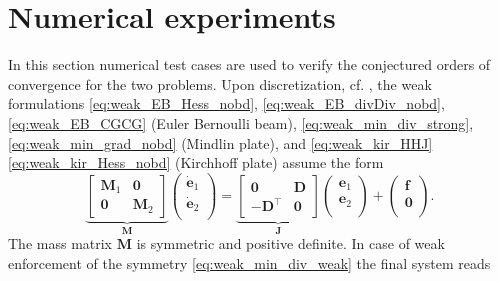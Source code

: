\section{Numerical experiments}
\label{sec:numerics_mixed}
In this section numerical test cases are used to verify the conjectured orders of convergence for the two problems. Upon discretization, cf. , the weak formulations \eqref{eq:weak_EB_Hess_nobd}, \eqref{eq:weak_EB_divDiv_nobd}, \eqref{eq:weak_EB_CGCG} (Euler Bernoulli beam), \eqref{eq:weak_min_div_strong}, \eqref{eq:weak_min_grad_nobd} (Mindlin plate), and \eqref{eq:weak_kir_HHJ} \eqref{eq:weak_kir_Hess_nobd} (Kirchhoff plate) assume the form 
\begin{equation*}
\underbrace{
	\begin{bmatrix}
	\mathbf{M}_1 & \mathbf{0} \\
	\mathbf{0} & \mathbf{M}_2
	\end{bmatrix}}_{\mathbf{M}}
\begin{pmatrix}
\dot{\mathbf{e}}_1 \\
\dot{\mathbf{e}}_2 \\
\end{pmatrix} = 
\underbrace{
	\begin{bmatrix}
	\mathbf{0} & \mathbf{D} \\
	-\mathbf{D}^\top & \mathbf{0}
	\end{bmatrix}}_{\mathbf{J}}
\begin{pmatrix}
{\mathbf{e}}_1 \\
{\mathbf{e}}_2 \\
\end{pmatrix} + 
\begin{pmatrix}
\mathbf{f} \\
\mathbf{0} \\
\end{pmatrix}. 
\end{equation*}
The mass matrix $\mathbf{M}$ is symmetric and positive definite. In case of weak enforcement of the symmetry \eqref{eq:weak_min_div_weak} the final system reads
